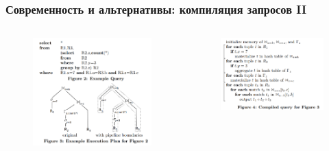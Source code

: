 \documentclass{beamer}
\begin{document}
\begin{frame}[fragile]
	\frametitle{Современность и альтернативы: компиляция запросов II}

	\begin{columns}
		\begin{column}{0.48\textwidth}
			\begin{figure}[htb]
			\includegraphics[width=\textwidth,height=0.40\textheight,keepaspectratio]{compilation-2.png} 
			\end{figure}
		\end{column}
		\begin{column}{0.48\textwidth}
			\begin{figure}[htb]
			\includegraphics[width=\textwidth,height=0.40\textheight,keepaspectratio]{compilation-3.png} 
			\end{figure}
		\end{column}
	\end{columns}


\end{frame}
\end{document}
